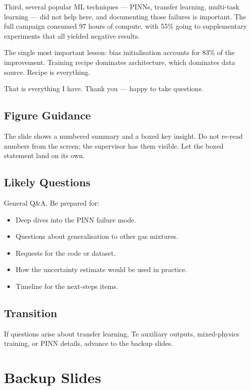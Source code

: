 \documentclass[12pt,a4paper]{article}
\begin{document}
Third, several popular ML techniques --- PINNs, transfer learning,
multi-task learning --- did not help here, and documenting those
failures is important.  The full campaign consumed 97 hours of
compute, with 55\% going to supplementary experiments that all
yielded negative results.

The single most important lesson: bias initialisation accounts for
83\% of the improvement.  Training recipe dominates architecture,
which dominates data source.  Recipe is everything.

That is everything I have.  Thank you --- happy to take questions.

\subsection*{Figure Guidance}
The slide shows a numbered summary and a boxed key insight.  Do not
re-read numbers from the screen; the supervisor has them visible.
Let the boxed statement land on its own.

\subsection*{Likely Questions}
General Q\&A.  Be prepared for:
\begin{itemize}
  \item Deep dives into the PINN failure mode.
  \item Questions about generalisation to other gas mixtures.
  \item Requests for the code or dataset.
  \item How the uncertainty estimate would be used in practice.
  \item Timeline for the next-steps items.
\end{itemize}

\subsection*{Transition}
If questions arise about transfer learning, Te auxiliary outputs,
mixed-physics training, or PINN details, advance to the backup
slides.

\clearpage

\section*{Backup Slides}
\end{document}
